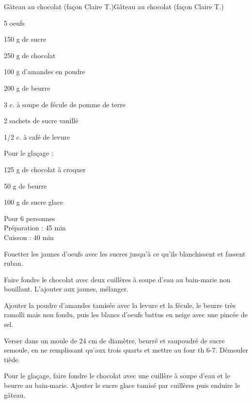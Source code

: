\begin{recette}{Gâteau au chocolat (façon Claire T.)}{Gâteau au chocolat (façon Claire T.)}

\begin{ingredients}
5 oeufs\par
150 g de sucre\par
250 g de chocolat\par
100 g d'amandes en poudre\par
200 g de beurre\par
3 c. à soupe de fécule de pomme de terre\par
2 sachets de sucre vanillé\par
1/2 c. à café de levure\par
Pour le glaçage :\par
125 g de chocolat à croquer\par
50 g de beurre\par
100 g de sucre glace\par
\end{ingredients}

\begin{infos}
Pour 6 personnes\\
Préparation : 45 min\\
Cuisson : 40 min\\
\end{infos}

\begin{etapes}
\item Fouetter les jaunes d'oeufs avec les sucres jusqu'à ce qu'ils blanchissent et fassent ruban.
\item Faire fondre le chocolat avec deux cuillères à soupe d'eau au bain-marie non bouillant. L'ajouter aux jaunes, mélanger.
\item Ajouter la poudre d'amandes tamisée avec la levure et la fécule, le beurre très ramolli mais non fondu, puis les blancs d'oeufs battus en neige avec une pincée de sel.
\item Verser dans un moule de 24 cm de diamètre, beurré et saupoudré de sucre semoule, en ne remplissant qu'aux trois quarts et mettre au four th 6-7. Démouler tiède.
\item Pour le glaçage, faire fondre le chocolat avec une cuillère à soupe d'eau et le beurre au bain-marie. Ajouter le sucre glace tamisé par cuillères puis enduire le gâteau.
\end{etapes}

\end{recette}